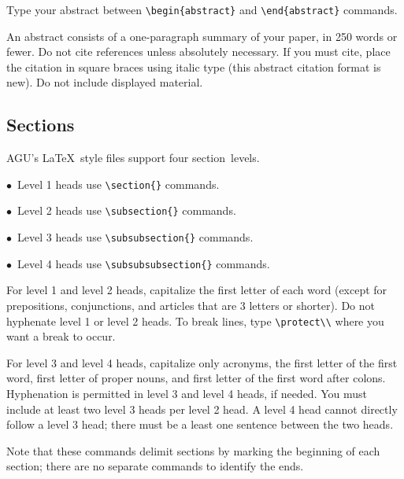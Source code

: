 \begin{article}
Type your abstract between \verb"\begin{abstract}"
and \verb"\end{abstract}" commands.

An abstract consists of a one-paragraph summary
of your paper, in 250 words or fewer.  Do not cite
references unless absolutely necessary.  If you
must cite, place the citation in square braces
using italic type (this abstract citation format
is new).  Do not include displayed material.


\subsection{Sections}

AGU's \LaTeX\ style files support four section~levels.

$\bullet$~Level 1 heads use \verb"\section{}" commands.

$\bullet$~Level 2 heads use \verb"\subsection{}" commands.

$\bullet$~Level 3 heads use \verb"\subsubsection{}" commands.

$\bullet$~Level 4 heads use \verb"\subsubsubsection{}" commands.

For level 1 and level 2 heads, capitalize the first 
letter of each word (except for prepositions, conjunctions, 
and articles that are 3 letters or shorter).  Do not 
hyphenate level 1 or level 2 heads.  To break lines, 
type \verb"\protect\\" where you want a break to occur.

For level 3 and level 4 heads, capitalize only acronyms, 
the first letter of the first word, first letter of proper 
nouns, and first letter of the first word after colons.
Hyphenation is permitted in level 3 and level 4 heads, 
if needed.  You must include at least two level 3 heads 
per level 2 head.  A level 4 head cannot directly follow 
a level 3 head; there must be a least one sentence between
the two heads.

Note that these commands delimit sections by marking the 
beginning of each section; there are no separate commands 
to identify the ends.


\end{article}
